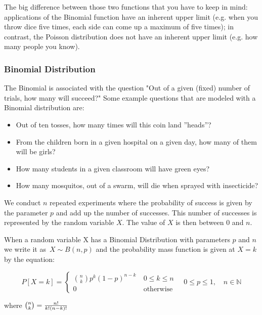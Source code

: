 The big difference between those two functions that you have to keep in mind: applications of the Binomial function have an inherent upper limit (e.g. when you throw dice five times, each side can come up a maximum of five times); in contrast, the Poisson distribution does not have an inherent upper limit (e.g. how many people you know).

\subsubsection{Binomial Distribution}
The Binomial is associated with the question "Out of a given (fixed) number of trials, how many will succeed?" Some example questions that are modeled with a Binomial distribution are:
\begin{itemize}
  \item Out of ten tosses, how many times will this coin land ''heads''?
  \item From the children born in a given hospital on a given day, how many of them will be girls?
  \item How many students in a given classroom will have green eyes?
  \item How many mosquitos, out of a swarm, will die when sprayed with insecticide?
\end{itemize}

  We conduct $n$ repeated experiments where the probability of success is given by the parameter $p$ and add up the number of successes. This number of successes is represented by the random variable $X$.  The value of $X$ is then between 0 and $n$.

When a random variable X has a Binomial Distribution with parameters $p$ and $n$ we write it as $\,X \sim B(n,p)$ and the probability mass function is given at $X=k$ by the equation:

\begin{equation}
    P\left[X = k\right] = \begin{cases} {n \choose k} p^k \left(1-p\right)^{n-k}\ & 0 \le k \le n \\ 0 & \mbox{otherwise} \end{cases} \quad 0 \leq p \leq 1, \quad n \in \mathbb{N}
\end{equation}

where ${n \choose k}={n! \over k!(n-k)!}$

